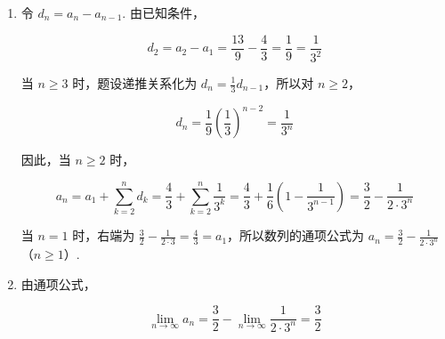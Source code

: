 \begin{solution}
\begin{enumerate}
\item 令 \(d_n=a_n-a_{n-1}\). 由已知条件，

\[
d_2=a_2-a_1=\frac{13}{9}-\frac{4}{3}=\frac{1}{9}=\frac{1}{3^2}
\]

当 \(n\geqslant3\) 时，题设递推关系化为 \(d_n=\frac{1}{3}d_{n-1}\)，所以对 \(n\geqslant2\)，

\[
d_n=\frac{1}{9}\left(\frac{1}{3}\right)^{n-2}=\frac{1}{3^n}
\]

因此，当 \(n\geqslant2\) 时，

\[
a_n=a_1+\sum_{k=2}^{n}d_k=\frac{4}{3}+\sum_{k=2}^{n}\frac{1}{3^k}=\frac{4}{3}+\frac{1}{6}\left(1-\frac{1}{3^{n-1}}\right)=\frac{3}{2}-\frac{1}{2\cdot3^n}
\]

当 \(n=1\) 时，右端为 \(\frac{3}{2}-\frac{1}{2\cdot3}=\frac{4}{3}=a_1\)，所以数列的通项公式为 \(a_n=\frac{3}{2}-\frac{1}{2\cdot3^n}\)（\(n\geqslant1\)）.

\item 由通项公式，

\[
\displaystyle\lim_{n\to\infty}a_n=\frac{3}{2}-\displaystyle\lim_{n\to\infty}\frac{1}{2\cdot3^n}=\frac{3}{2}
\]
\end{enumerate}
\end{solution}
